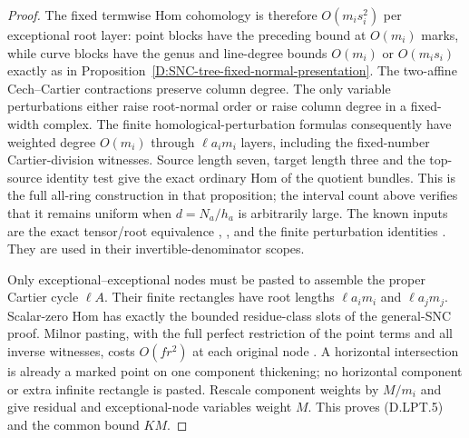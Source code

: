 \begin{proof}
The fixed termwise Hom cohomology is therefore $O(m_i s_i^2)$
per exceptional root layer: point blocks have the preceding
bound at $O(m_i)$ marks, while curve blocks have the genus and
line-degree bounds $O(m_i)$ or $O(m_is_i)$ exactly as in
Proposition~\ref{D:SNC-tree-fixed-normal-presentation}.
The two-affine Cech--Cartier contractions preserve column degree.
The only variable perturbations either raise root-normal order
or raise column degree in a fixed-width complex. The finite
homological-perturbation formulas consequently have weighted
degree $O(m_i)$ through $\ell a_i m_i$ layers, including the
fixed-number Cartier-division witnesses. Source length seven,
target length three and the top-source identity test give the
exact ordinary Hom of the quotient bundles. This is the full
all-ring construction in that proposition; the interval count
above verifies that it remains uniform when $d=N_a/h_a$ is
arbitrarily large.
The known inputs are the exact tensor/root equivalence
\citep[Proposition~3 and Theorem~4]{Borne2007D},
\citep[Theorem~6.1]{BorneVistoli2012D}, and the finite perturbation
identities
\citep[Sections~2.1--2.4 and~3.2]{C_Crainic2004Perturbation}.
They are used in their invertible-denominator scopes.

Only exceptional--exceptional nodes must be pasted to assemble
the proper Cartier cycle $\ell A$. Their finite rectangles have
root lengths $\ell a_i m_i$ and $\ell a_jm_j$. Scalar-zero Hom
has exactly the bounded residue-class slots of the general-SNC
proof. Milnor pasting, with the full perfect restriction of the
point terms and all inverse witnesses, costs $O(fr^2)$ at each
original node
\citep[Lemmas~15.6.4--15.6.9, Tag~0D2J]{StacksTreePastingD}.
A horizontal intersection is already a marked point on one
component thickening; no horizontal component or extra infinite
rectangle is pasted. Rescale component weights by $M/m_i$ and
give residual and exceptional-node variables weight $M$.
This proves (D.LPT.5) and the common bound $KM$.


\end{proof}
